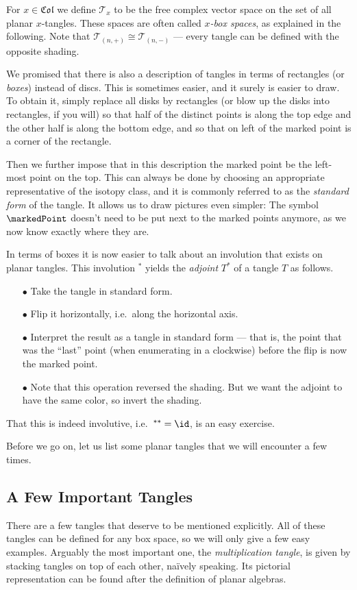 For $x\in\mathfrak{Col}$ we define $\mathcal{T}_x$ to be the free complex vector space on the set of all planar $x$-tangles. These spaces are often called \emph{$x$-box spaces}\footnotemark, as explained in the following.
Note that $\mathcal{T}_{(n,+)}\cong \mathcal{T}_{(n,-)}$ --- every tangle can be defined with the opposite shading.

\bigno
We promised that there is also a description of tangles in terms of rectangles (or \emph{boxes}) instead of discs. This is sometimes easier, and it surely is easier to draw. To obtain it, simply replace all disks by rectangles (or blow up the disks into rectangles, if you will) so that half of the distinct points is along the top edge and the other half is along the bottom edge, and so that on left of the marked point is a corner of the rectangle.

Then we further impose that in this description the marked point be the left-most point on the top. This can always be done by choosing an appropriate representative of the isotopy class, and it is commonly referred to as the \emph{standard form} of the tangle. It allows us to draw pictures even simpler: The symbol $\markedPoint$ doesn't need to be put next to the marked points anymore, as we now know exactly where they are.

\bigno
In terms of boxes it is now easier to talk about an involution that exists on planar tangles. This involution ${}^*$ yields the \emph{adjoint} $T^*$ of a tangle $T$ as follows.
\begin{itemize}
\item[\textsf{$\bullet$}] Take the tangle in standard form.
\item[$\bullet$] Flip it horizontally, i.e.\ along the horizontal axis.
\item[$\bullet$] Interpret the result as a tangle in standard form --- that is, the point that was the ``last'' point (when enumerating in a clockwise) before the flip is now the marked point.
\item[$\bullet$] Note that this operation reversed the shading. But we want the adjoint to have the same color, so invert the shading.
\end{itemize}
That this is indeed involutive, i.e.\ ${}^{**}=\id$, is an easy exercise.

\bigno
Before we go on, let us list some planar tangles that we will encounter a few times.
\subsection*{A Few Important Tangles}
There are a few tangles that deserve to be mentioned explicitly. All of these tangles can be defined for any box space, so we will only give a few easy examples. Arguably the most important one, the \emph{multiplication tangle}, is given by stacking tangles on top of each other, na\"ively speaking. Its pictorial representation can be found after the definition of planar algebras.

